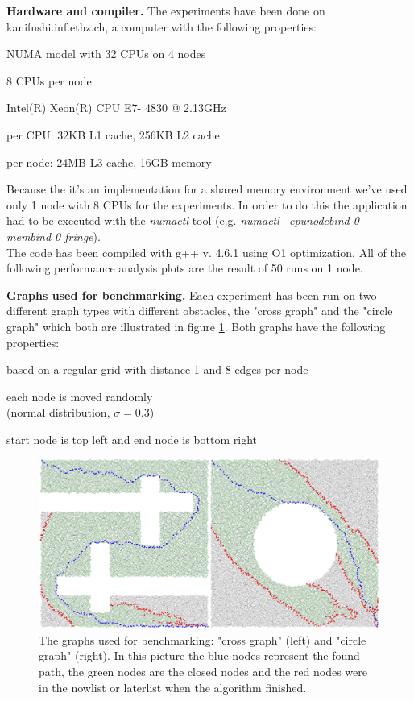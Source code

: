 \documentclass[letterpaper]{article}
\newcommand{\mypar}[1]{{\bf #1.}}
\begin{document}
\mypar{Hardware and compiler}
The experiments have been done on kanifushi.inf.ethz.ch, a computer with the following properties:
\begin{compactitem}
\item NUMA model with 32 CPUs on 4 nodes
\item 8 CPUs per node
\item Intel(R) Xeon(R) CPU E7- 4830 @ 2.13GHz
\item per CPU: 32KB L1 cache, 256KB L2 cache
\item per node: 24MB L3 cache, 16GB memory
\end{compactitem}
Because the it's an implementation for a shared memory environment we've used only 1 node with 8 CPUs for the experiments. In order to do this the application had to be executed with the \textit{numactl} tool (e.g. \textit{numactl --cpunodebind 0 --membind 0 fringe}).\\
The code has been compiled with g++ v. 4.6.1 using O1 optimization. All of the following performance analysis plots are the result of 50 runs on 1 node.

\mypar{Graphs used for benchmarking}
Each experiment has been run on two different graph types with different obstacles, the "cross graph" and the "circle graph" which both are illustrated in figure \ref{fig:graphs}. Both graphs have the following properties:
\begin{compactitem}
\item based on a regular grid with distance 1 and 8 edges per node
\item each node is moved randomly\\(normal distribution, $\sigma = 0.3$)
\item start node is top left and end node is bottom right
\end{compactitem}

\begin{figure}[h]\centering
  \includegraphics[scale=0.3]{benchmark_graphs.eps}
  \caption{The graphs used for benchmarking: "cross graph" (left) and "circle graph" (right). In this picture the blue nodes represent the found path, the green nodes are the closed nodes and the red nodes were in the nowlist or laterlist when the algorithm finished. \label{fig:graphs}}
\end{figure}
\end{document}
